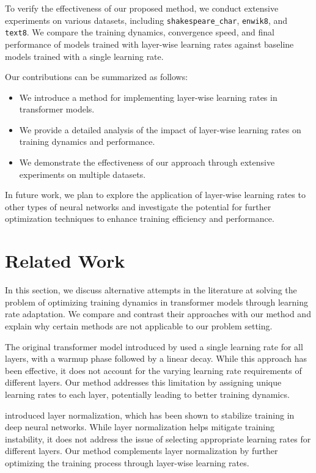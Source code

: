 \documentclass{article} %
\begin{document}
To verify the effectiveness of our proposed method, we conduct extensive experiments on various datasets, including \texttt{shakespeare\_char}, \texttt{enwik8}, and \texttt{text8}. We compare the training dynamics, convergence speed, and final performance of models trained with layer-wise learning rates against baseline models trained with a single learning rate.

Our contributions can be summarized as follows:
\begin{itemize}
    \item We introduce a method for implementing layer-wise learning rates in transformer models.
    \item We provide a detailed analysis of the impact of layer-wise learning rates on training dynamics and performance.
    \item We demonstrate the effectiveness of our approach through extensive experiments on multiple datasets.
\end{itemize}

In future work, we plan to explore the application of layer-wise learning rates to other types of neural networks and investigate the potential for further optimization techniques to enhance training efficiency and performance.

\section{Related Work}
\label{sec:related}

In this section, we discuss alternative attempts in the literature at solving the problem of optimizing training dynamics in transformer models through learning rate adaptation. We compare and contrast their approaches with our method and explain why certain methods are not applicable to our problem setting.

The original transformer model introduced by \citet{vaswani2017attention} used a single learning rate for all layers, with a warmup phase followed by a linear decay. While this approach has been effective, it does not account for the varying learning rate requirements of different layers. Our method addresses this limitation by assigning unique learning rates to each layer, potentially leading to better training dynamics.

\citet{ba2016layer} introduced layer normalization, which has been shown to stabilize training in deep neural networks. While layer normalization helps mitigate training instability, it does not address the issue of selecting appropriate learning rates for different layers. Our method complements layer normalization by further optimizing the training process through layer-wise learning rates.
\end{document}
